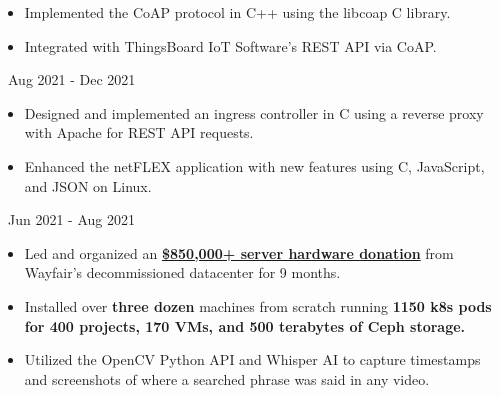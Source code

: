 \documentclass[11pt,letterpaper,ragged2e]{altacv}
\begin{document}
{
	\begin{itemize}
		\item Implemented the CoAP protocol in C++ using the libcoap C library.
		\item Integrated with ThingsBoard IoT Software's REST API via CoAP.
	\end{itemize}
}
{\faCalendar\, Aug 2021 - Dec 2021}
{
}

{
	\begin{itemize}
		\item Designed and implemented an ingress controller in C using a reverse proxy with Apache for REST API requests.
		\item Enhanced the netFLEX application with new features using C, JavaScript, and JSON on Linux.
	\end{itemize}
}
{\faCalendar\, Jun 2021 - Aug 2021}
{
}



{
	\begin{itemize}
		\item Led and organized an \href{https://www.rit.edu/news/wayfair-gifts-850000-servers-rits-computer-science-house}{\textbf{\$850,000+ server hardware donation}} from Wayfair's decommissioned datacenter for 9 months.
		\item Installed over \textbf{three dozen} machines from scratch running \textbf{1150 k8s pods for 400 projects, 170 VMs, and 500 terabytes of Ceph storage.}
	\end{itemize}
}
{
}

{
	\begin{itemize}
		\item Utilized the OpenCV Python API and Whisper AI to capture timestamps and screenshots of where a searched phrase was said in any video.
	\end{itemize}
}
{
}
\end{document}
